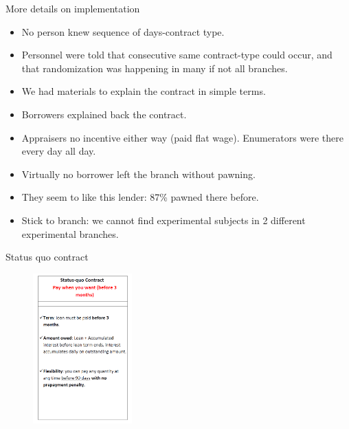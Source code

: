 \documentclass[9pt, aspectratio=169]{beamer}
\begin{document}
\begin{frame}{More details on implementation}
    \begin{itemize}
        \item No person knew sequence of days-contract type.
        \item  Personnel were told that consecutive same contract-type could occur, and that randomization was happening in many if not all branches.
        \item We had materials to explain the contract in simple terms.
        \item Borrowers explained back the contract.
        \item Appraisers no incentive either way (paid flat wage). Enumerators were there every day all day.
        \item Virtually no borrower left the branch without pawning.
        \item They seem to like this lender: 87\% pawned there before.
        \item Stick to branch: we cannot find experimental subjects in 2 different experimental branches. 
    \end{itemize}
\end{frame}



\begin{frame}{Status quo contract}
\vspace{-.2in}
    \begin{figure}[H]
    \label{ExplanatoryMaterial1}
    \begin{center}
        \includegraphics[width=0.34\textwidth]{Figuras/sq_contract.png}
    \end{center}
\end{figure}
\end{frame}
\end{document}
